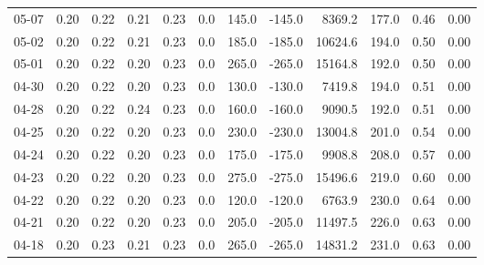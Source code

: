 \begin{threeparttable}
{\begin{tabular}{lrrrrrrrrrrr}
  05-07 &          0.20 &          0.22 &          0.21 &        0.23 &                 0.0 &               145.0 &     -145.0 &              8369.2 &            177.0 &            0.46 &                   0.00 \\
  05-02 &          0.20 &          0.22 &          0.21 &        0.23 &                 0.0 &               185.0 &     -185.0 &             10624.6 &            194.0 &            0.50 &                   0.00 \\
  05-01 &          0.20 &          0.22 &          0.20 &        0.23 &                 0.0 &               265.0 &     -265.0 &             15164.8 &            192.0 &            0.50 &                   0.00 \\
  04-30 &          0.20 &          0.22 &          0.20 &        0.23 &                 0.0 &               130.0 &     -130.0 &              7419.8 &            194.0 &            0.51 &                   0.00 \\
  04-28 &          0.20 &          0.22 &          0.24 &        0.23 &                 0.0 &               160.0 &     -160.0 &              9090.5 &            192.0 &            0.51 &                   0.00 \\
  04-25 &          0.20 &          0.22 &          0.20 &        0.23 &                 0.0 &               230.0 &     -230.0 &             13004.8 &            201.0 &            0.54 &                   0.00 \\
  04-24 &          0.20 &          0.22 &          0.20 &        0.23 &                 0.0 &               175.0 &     -175.0 &              9908.8 &            208.0 &            0.57 &                   0.00 \\
  04-23 &          0.20 &          0.22 &          0.20 &        0.23 &                 0.0 &               275.0 &     -275.0 &             15496.6 &            219.0 &            0.60 &                   0.00 \\
  04-22 &          0.20 &          0.22 &          0.20 &        0.23 &                 0.0 &               120.0 &     -120.0 &              6763.9 &            230.0 &            0.64 &                   0.00 \\
  04-21 &          0.20 &          0.22 &          0.20 &        0.23 &                 0.0 &               205.0 &     -205.0 &             11497.5 &            226.0 &            0.63 &                   0.00 \\
  04-18 &          0.20 &          0.23 &          0.21 &        0.23 &                 0.0 &               265.0 &     -265.0 &             14831.2 &            231.0 &            0.63 &                   0.00 \\

\end{tabular}}
\end{threeparttable}
